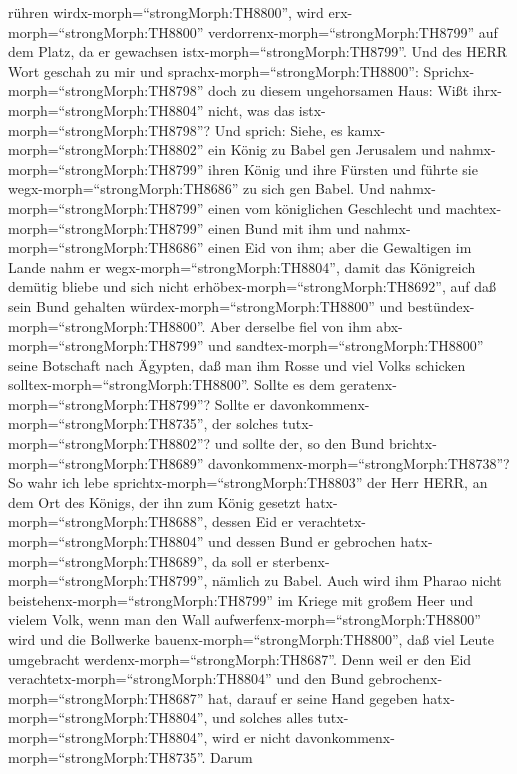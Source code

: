 rühren wirdx-morph=``strongMorph:TH8800'', wird
erx-morph=``strongMorph:TH8800'' verdorrenx-morph=``strongMorph:TH8799''
auf dem Platz, da er gewachsen istx-morph=``strongMorph:TH8799''.
 Und des HERR Wort geschah zu mir und
sprachx-morph=``strongMorph:TH8800'': 
Sprichx-morph=``strongMorph:TH8798'' doch zu diesem ungehorsamen Haus:
Wißt ihrx-morph=``strongMorph:TH8804'' nicht, was das
istx-morph=``strongMorph:TH8798''? Und sprich: Siehe, es
kamx-morph=``strongMorph:TH8802'' ein König zu Babel gen Jerusalem und
nahmx-morph=``strongMorph:TH8799'' ihren König und ihre Fürsten und
führte sie wegx-morph=``strongMorph:TH8686'' zu sich gen Babel.
 Und nahmx-morph=``strongMorph:TH8799'' einen vom
königlichen Geschlecht und machtex-morph=``strongMorph:TH8799'' einen
Bund mit ihm und nahmx-morph=``strongMorph:TH8686'' einen Eid von ihm;
aber die Gewaltigen im Lande nahm er wegx-morph=``strongMorph:TH8804'',
 damit das Königreich demütig bliebe und sich nicht
erhöbex-morph=``strongMorph:TH8692'', auf daß sein Bund gehalten
würdex-morph=``strongMorph:TH8800'' und
bestündex-morph=``strongMorph:TH8800''.  Aber derselbe fiel
von ihm abx-morph=``strongMorph:TH8799'' und
sandtex-morph=``strongMorph:TH8800'' seine Botschaft nach Ägypten, daß
man ihm Rosse und viel Volks schicken
solltex-morph=``strongMorph:TH8800''. Sollte es dem
geratenx-morph=``strongMorph:TH8799''? Sollte er
davonkommenx-morph=``strongMorph:TH8735'', der solches
tutx-morph=``strongMorph:TH8802''? und sollte der, so den Bund
brichtx-morph=``strongMorph:TH8689''
davonkommenx-morph=``strongMorph:TH8738''?  So wahr ich
lebe sprichtx-morph=``strongMorph:TH8803'' der Herr HERR, an dem Ort des
Königs, der ihn zum König gesetzt hatx-morph=``strongMorph:TH8688'',
dessen Eid er verachtetx-morph=``strongMorph:TH8804'' und dessen Bund er
gebrochen hatx-morph=``strongMorph:TH8689'', da soll er
sterbenx-morph=``strongMorph:TH8799'', nämlich zu Babel. 
Auch wird ihm Pharao nicht beistehenx-morph=``strongMorph:TH8799'' im
Kriege mit großem Heer und vielem Volk, wenn man den Wall
aufwerfenx-morph=``strongMorph:TH8800'' wird und die Bollwerke
bauenx-morph=``strongMorph:TH8800'', daß viel Leute umgebracht
werdenx-morph=``strongMorph:TH8687''.  Denn weil er den Eid
verachtetx-morph=``strongMorph:TH8804'' und den Bund
gebrochenx-morph=``strongMorph:TH8687'' hat, darauf er seine Hand
gegeben hatx-morph=``strongMorph:TH8804'', und solches alles
tutx-morph=``strongMorph:TH8804'', wird er nicht
davonkommenx-morph=``strongMorph:TH8735''.  Darum
